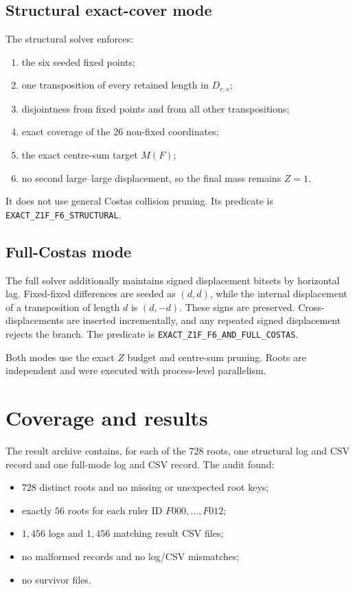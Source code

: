 \documentclass[11pt,a4paper]{article}
\newcommand{\code}[1]{\texttt{#1}}
\begin{document}
\subsection{Structural exact-cover mode}
The structural solver enforces:
\begin{enumerate}
\item the six seeded fixed points;
\item one transposition of every retained length in $D_{r,s}$;
\item disjointness from fixed points and from all other transpositions;
\item exact coverage of the $26$ non-fixed coordinates;
\item the exact centre-sum target $M(F)$;
\item no second large--large displacement, so the final mass remains $Z=1$.
\end{enumerate}
It does not use general Costas collision pruning. Its predicate is \code{EXACT\_Z1F\_F6\_STRUCTURAL}.

\subsection{Full-Costas mode}
The full solver additionally maintains signed displacement bitsets by horizontal lag. Fixed-fixed differences are seeded as $(d,d)$, while the internal displacement of a transposition of length $d$ is $(d,-d)$. These signs are preserved. Cross-displacements are inserted incrementally, and any repeated signed displacement rejects the branch. The predicate is \code{EXACT\_Z1F\_F6\_AND\_FULL\_COSTAS}.

Both modes use the exact $Z$ budget and centre-sum pruning. Roots are independent and were executed with process-level parallelism.

\section{Coverage and results}
The result archive contains, for each of the $728$ roots, one structural log and CSV record and one full-mode log and CSV record. The audit found:
\begin{itemize}
\item $728$ distinct roots and no missing or unexpected root keys;
\item exactly $56$ roots for each ruler ID $F000,\ldots,F012$;
\item $1{,}456$ logs and $1{,}456$ matching result CSV files;
\item no malformed records and no log/CSV mismatches;
\item no survivor files.
\end{itemize}
\end{document}
